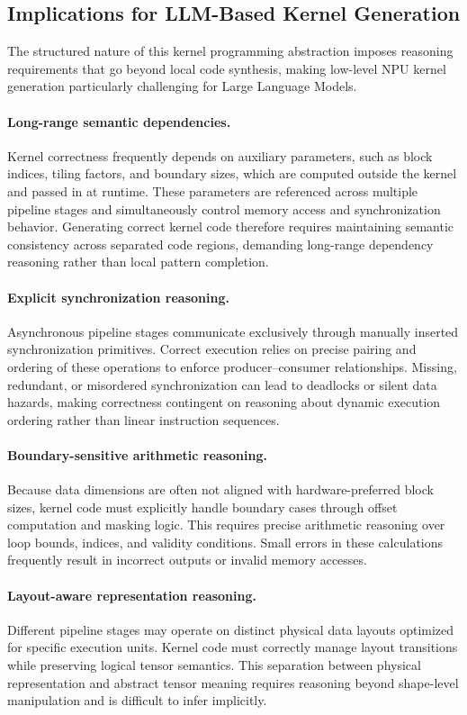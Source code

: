 \subsection{Implications for LLM-Based Kernel Generation}
\label{sec:llm_challenges}

The structured nature of this kernel programming abstraction imposes reasoning requirements that go beyond local code synthesis, making low-level NPU kernel generation particularly challenging for Large Language Models.

\paragraph{Long-range semantic dependencies.}
Kernel correctness frequently depends on auxiliary parameters, such as block indices, tiling factors, and boundary sizes, which are computed outside the kernel and passed in at runtime. These parameters are referenced across multiple pipeline stages and simultaneously control memory access and synchronization behavior. Generating correct kernel code therefore requires maintaining semantic consistency across separated code regions, demanding long-range dependency reasoning rather than local pattern completion.

\paragraph{Explicit synchronization reasoning.}
Asynchronous pipeline stages communicate exclusively through manually inserted synchronization primitives. Correct execution relies on precise pairing and ordering of these operations to enforce producer--consumer relationships. Missing, redundant, or misordered synchronization can lead to deadlocks or silent data hazards, making correctness contingent on reasoning about dynamic execution ordering rather than linear instruction sequences.

\paragraph{Boundary-sensitive arithmetic reasoning.}
Because data dimensions are often not aligned with hardware-preferred block sizes, kernel code must explicitly handle boundary cases through offset computation and masking logic. This requires precise arithmetic reasoning over loop bounds, indices, and validity conditions. Small errors in these calculations frequently result in incorrect outputs or invalid memory accesses.

\paragraph{Layout-aware representation reasoning.}
Different pipeline stages may operate on distinct physical data layouts optimized for specific execution units. Kernel code must correctly manage layout transitions while preserving logical tensor semantics. This separation between physical representation and abstract tensor meaning requires reasoning beyond shape-level manipulation and is difficult to infer implicitly.

